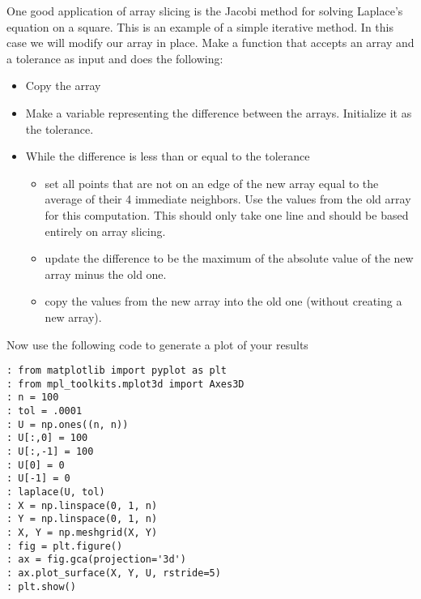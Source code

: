 \begin{problem}
One good application of array slicing is the Jacobi method for solving Laplace's equation on a square.
This is an example of a simple iterative method.
In this case we will modify our array in place.
Make a function that accepts an array and a tolerance as input and does the following:
\begin{itemize}
\item Copy the array
\item Make a variable representing the difference between the arrays.
Initialize it as the tolerance.
\item While the difference is less than or equal to the tolerance
\begin{itemize}
	\item set all points that are not on an edge of the new array equal to the average of their 4 immediate neighbors.
Use the values from the old array for this computation.
This should only take one line and should be based entirely on array slicing.
	\item update the difference to be the maximum of the absolute value of the new array minus the old one.
	\item copy the values from the new array into the old one (without creating a new array).
\end{itemize}
\end{itemize}

Now use the following code to generate a plot of your results
\begin{lstlisting}
: from matplotlib import pyplot as plt
: from mpl_toolkits.mplot3d import Axes3D
: n = 100
: tol = .0001
: U = np.ones((n, n))
: U[:,0] = 100
: U[:,-1] = 100
: U[0] = 0
: U[-1] = 0
: laplace(U, tol)
: X = np.linspace(0, 1, n)
: Y = np.linspace(0, 1, n)
: X, Y = np.meshgrid(X, Y)
: fig = plt.figure()
: ax = fig.gca(projection='3d')
: ax.plot_surface(X, Y, U, rstride=5)
: plt.show()
\end{lstlisting}
\end{problem}

